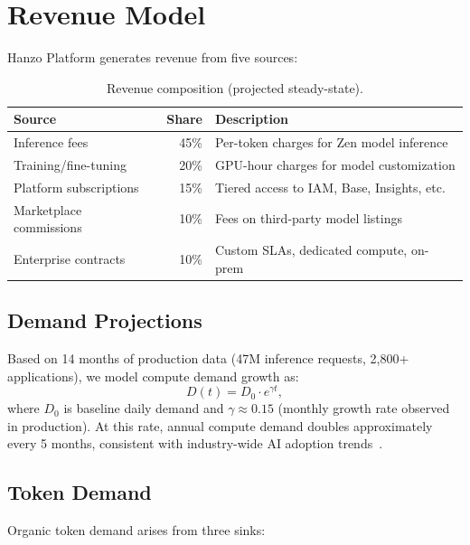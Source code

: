 \section{Revenue Model}

\label{sec:revenue}

Hanzo Platform generates revenue from five sources:

\begin{table}[H]
\centering
\small
\begin{tabular}{lrp{5cm}}
\toprule
\textbf{Source} & \textbf{Share} & \textbf{Description} \\
\midrule
Inference fees & 45\% & Per-token charges for Zen model inference \\
Training/fine-tuning & 20\% & GPU-hour charges for model customization \\
Platform subscriptions & 15\% & Tiered access to IAM, Base, Insights, etc. \\
Marketplace commissions & 10\% & Fees on third-party model listings \\
Enterprise contracts & 10\% & Custom SLAs, dedicated compute, on-prem \\
\bottomrule
\end{tabular}
\caption{Revenue composition (projected steady-state).}
\label{tab:revenue}
\end{table}

\subsection{Demand Projections}

Based on 14 months of production data (47M inference requests, 2,800+
applications), we model compute demand growth as:
\begin{equation}
D(t) = D_0 \cdot e^{\gamma t},
\end{equation}
where $D_0$ is baseline daily demand and $\gamma \approx 0.15$ (monthly growth
rate observed in production). At this rate, annual compute demand doubles
approximately every 5 months, consistent with industry-wide AI adoption
trends~\cite{mckinseyai2024}.

\subsection{Token Demand}

Organic token demand arises from three sinks:

